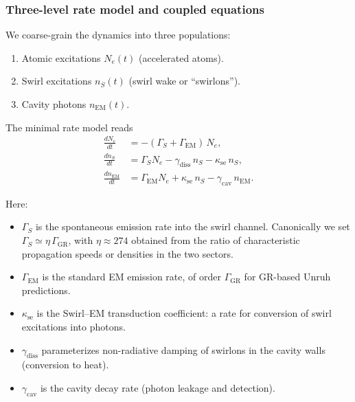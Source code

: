 \documentclass[10pt,reprint,aps,onecolumn,nofootinbib]{revtex4-2}
\begin{document}
    \subsubsection{Three-level rate model and coupled equations}
        \label{subsubsec:three_level_model}

        We coarse-grain the dynamics into three populations:

        \begin{enumerate}
            \item Atomic excitations $N_e(t)$ (accelerated atoms).
            \item Swirl excitations $n_S(t)$ (swirl wake or ``swirlons'').
            \item Cavity photons $n_{\mathrm{EM}}(t)$.
        \end{enumerate}

        The minimal rate model reads
        \begin{subequations}
            \label{eq:rate_system_full}
            \begin{align}
                \frac{d N_e}{dt}
                &=
                -(\Gamma_S + \Gamma_{\mathrm{EM}})\,N_e,
                \label{eq:dNe_dt}
                \\
                \frac{d n_S}{dt}
                &=
                \Gamma_S N_e
                - \gamma_{\mathrm{diss}}\, n_S
                - \kappa_{\text{se}}\, n_S,
                \label{eq:dnS_dt}
                \\
                \frac{d n_{\mathrm{EM}}}{dt}
                &=
                \Gamma_{\mathrm{EM}} N_e
                + \kappa_{\text{se}}\, n_S
                - \gamma_{\mathrm{cav}}\, n_{\mathrm{EM}}.
                \label{eq:dnEM_dt}
            \end{align}
        \end{subequations}

        Here:

        \begin{itemize}
            \item $\Gamma_S$ is the spontaneous emission rate into the swirl channel.
            Canonically we set $\Gamma_S \simeq \eta \,\Gamma_{\mathrm{GR}}$,
            with $\eta \approx 274$ obtained from the ratio of characteristic
            propagation speeds or densities in the two sectors.
            \item $\Gamma_{\mathrm{EM}}$ is the standard EM emission rate, of order
            $\Gamma_{\mathrm{GR}}$ for GR-based Unruh predictions.
            \item $\kappa_{\text{se}}$ is the Swirl--EM transduction coefficient: a rate for
            conversion of swirl excitations into photons.
            \item $\gamma_{\mathrm{diss}}$ parameterizes non-radiative damping of
            swirlons in the cavity walls (conversion to heat).
            \item $\gamma_{\mathrm{cav}}$ is the cavity decay rate (photon leakage and
            detection).
        \end{itemize}
\end{document}

